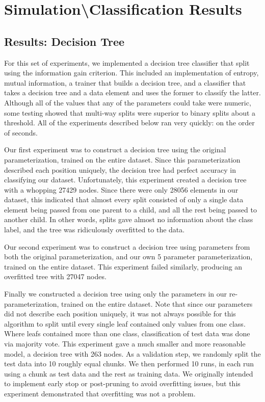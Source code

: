 \documentclass[fleqn]{article}
\begin{document}
\section[Results]{Simulation\textbackslash Classification Results}
\label{sec:Results}

\subsection{Results: Decision Tree}
\label{sub:resultsTrees}
For this set of experiments, we implemented a decision tree classifier that split using the information gain criterion. This included an implementation of entropy, mutual information, a trainer that builds a decision tree, and a classifier that takes a decision tree and a data element and uses the former to classify the latter. Although all of the values that any of the parameters could take were numeric, some testing showed that multi-way splits were superior to binary splits about a threshold. All of the experiments described below ran very quickly: on the order of seconds.

Our first experiment was to construct a decision tree using the original parameterization, trained on the entire dataset. Since this parameterization described each position uniquely, the decision tree had perfect accuracy in classifying our dataset. Unfortunately, this experiment created a decision tree with a whopping 27429 nodes. Since there were only 28056 elements in our dataset, this indicated that almost every split consisted of only a single data element being passed from one parent to a child, and all the rest being passed to another child. In other words, splits gave almost no information about the class label, and the tree was ridiculously overfitted to the data.

Our second experiment was to construct a decision tree using parameters from both the original parameterization, and our own 5 parameter parameterization, trained on the entire dataset. This experiment failed similarly, producing an overfitted tree with 27047 nodes.

Finally we constructed a decision tree using only the parameters in our re-parameterization, trained on the entire dataset. Note that since our parameters did not describe each position uniquely, it was not always possible for this algorithm to split until every single leaf contained only values from one class. Where leafs contained more than one class, classification of test data was done via majority vote. This experiment gave a much smaller and more reasonable model, a decision tree with 263 nodes. As a validation step, we randomly split the test data into 10 roughly equal chunks. We then performed 10 runs, in each run using a chunk as test data and the rest as training data. We originally intended to implement early stop or post-pruning to avoid overfitting issues, but this experiment demonstrated that overfitting was not a problem.
\end{document}
